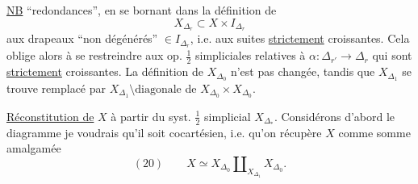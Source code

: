 \uline{NB} 
``redondances'', en se bornant dans la
définition de
\[
X_{\Delta_r}\subset X\times I_{\Delta_r}
\]
aux drapeaux ``non dégénérés'' $\in I_{\Delta_r}$,
i.e. aux suites \uline{strictement} croissantes. Cela
oblige alors à se restreindre aux op.
$\frac12$ simpliciales relatives à  $\alpha:\Delta_{r'}\longrightarrow\Delta_r$ qui
sont \uline{strictement} croissantes. La définition
de $X_{\Delta_0}$ n'est pas changée, tandis que
$X_{\Delta_1}$ se trouve remplacé par $X_{\Delta_1}\setminus\text{diagonale}$
de $X_{\Delta_0}\times X_{\Delta_0}$.

\uline{Réconstitution de} $X$ à partir du syst.
$\frac12$ simplicial $X_{\Delta_*}$. Considérons d'abord
le diagramme
je voudrais qu'il soit cocartésien, i.e.
qu'on récupère $X$ comme somme amalgamée
\[
(20)\qquad X\simeq X_{\Delta_0}\amalg_{X_{\Delta_1}}X_{\Delta_0}.
\]
